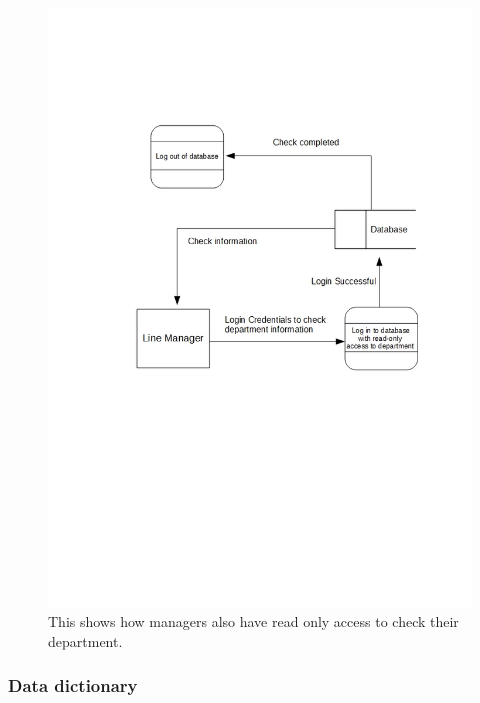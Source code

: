 \begin{figure}[H]
\includegraphics[width=\textwidth]{ManagerReadOnly.jpg}
\caption{This shows how managers also have read only access to check their department.} \label{Page1Interview}
\end{figure}


\subsubsection{Data dictionary}



